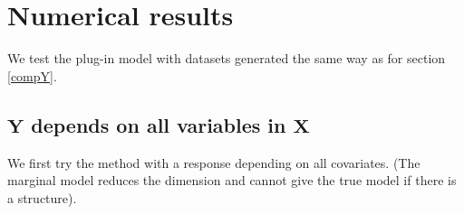 \documentclass[12pt,a4paper]{report}
\begin{document}
%		
%		
%
				
		
		
	\section{Numerical results} \label{resnumpred}
		We test the plug-in model with datasets generated the same way as for section \ref{compY}.\\
		
\subsection{$\boldsymbol{Y}$ depends on all variables in $\boldsymbol{X}$}	
We first try the method with a response depending on all covariates. (The marginal model reduces the dimension and cannot give the true model if there is a structure).
\end{document}
